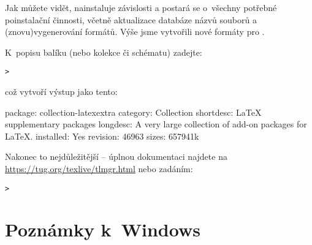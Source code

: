 \documentclass[\classoptions,slovak,english,czech]{\classname}
\begin{document}
Jak můžete vidět,  nainstaluje závislosti
a postará se o~všechny potřebné poinstalační činnosti, 
včetně aktualizace databáze názvů souborů 
a (znovu)vygenerování formátů.  Výše jsme vytvořili
nové formáty pro \XeTeX.

K~popisu balíku (nebo kolekce či schématu) zadejte:
\begin{alltt}
> 
\end{alltt}
což vytvoří výstup jako tento:
\begin{fverbatim}
package:    collection-latexextra
category:   Collection
shortdesc:  LaTeX supplementary packages
longdesc:   A very large collection of add-on packages for LaTeX.
installed:  Yes
revision:   46963
sizes:      657941k
\end{fverbatim}

Nakonec to nejdůležitější -- úplnou dokumentaci najdete na
\url{https://tug.org/texlive/tlmgr.html} nebo zadáním:
\begin{alltt}
> 
\end{alltt}

\section{Poznámky k~Windows}
\label{sec:windows}
\end{document}
